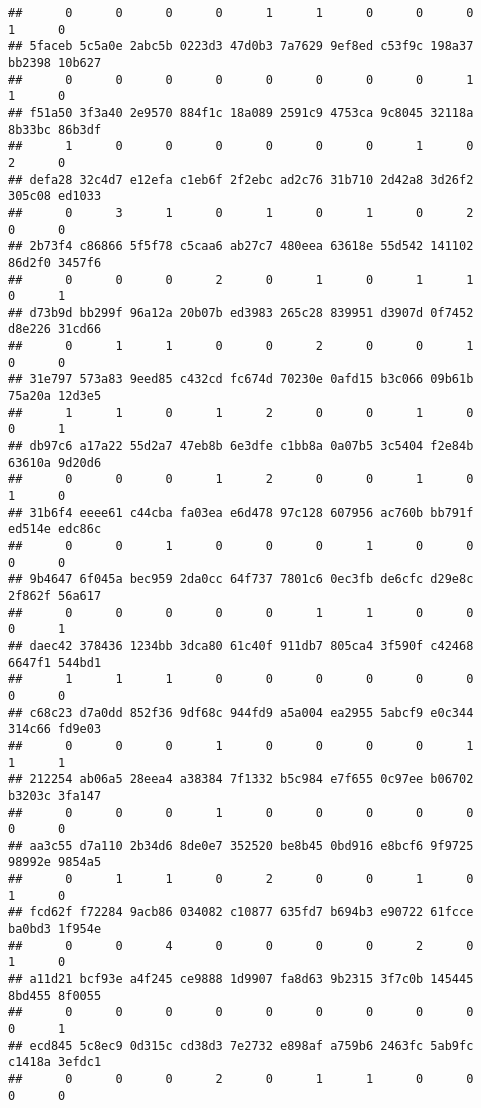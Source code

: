 \documentclass[
]{article}
\begin{document}
\begin{verbatim}
##      0      0      0      0      1      1      0      0      0      1      0 
## 5faceb 5c5a0e 2abc5b 0223d3 47d0b3 7a7629 9ef8ed c53f9c 198a37 bb2398 10b627 
##      0      0      0      0      0      0      0      0      1      1      0 
## f51a50 3f3a40 2e9570 884f1c 18a089 2591c9 4753ca 9c8045 32118a 8b33bc 86b3df 
##      1      0      0      0      0      0      0      1      0      2      0 
## defa28 32c4d7 e12efa c1eb6f 2f2ebc ad2c76 31b710 2d42a8 3d26f2 305c08 ed1033 
##      0      3      1      0      1      0      1      0      2      0      0 
## 2b73f4 c86866 5f5f78 c5caa6 ab27c7 480eea 63618e 55d542 141102 86d2f0 3457f6 
##      0      0      0      2      0      1      0      1      1      0      1 
## d73b9d bb299f 96a12a 20b07b ed3983 265c28 839951 d3907d 0f7452 d8e226 31cd66 
##      0      1      1      0      0      2      0      0      1      0      0 
## 31e797 573a83 9eed85 c432cd fc674d 70230e 0afd15 b3c066 09b61b 75a20a 12d3e5 
##      1      1      0      1      2      0      0      1      0      0      1 
## db97c6 a17a22 55d2a7 47eb8b 6e3dfe c1bb8a 0a07b5 3c5404 f2e84b 63610a 9d20d6 
##      0      0      0      1      2      0      0      1      0      1      0 
## 31b6f4 eeee61 c44cba fa03ea e6d478 97c128 607956 ac760b bb791f ed514e edc86c 
##      0      0      1      0      0      0      1      0      0      0      0 
## 9b4647 6f045a bec959 2da0cc 64f737 7801c6 0ec3fb de6cfc d29e8c 2f862f 56a617 
##      0      0      0      0      0      1      1      0      0      0      1 
## daec42 378436 1234bb 3dca80 61c40f 911db7 805ca4 3f590f c42468 6647f1 544bd1 
##      1      1      1      0      0      0      0      0      0      0      0 
## c68c23 d7a0dd 852f36 9df68c 944fd9 a5a004 ea2955 5abcf9 e0c344 314c66 fd9e03 
##      0      0      0      1      0      0      0      0      1      1      1 
## 212254 ab06a5 28eea4 a38384 7f1332 b5c984 e7f655 0c97ee b06702 b3203c 3fa147 
##      0      0      0      1      0      0      0      0      0      0      0 
## aa3c55 d7a110 2b34d6 8de0e7 352520 be8b45 0bd916 e8bcf6 9f9725 98992e 9854a5 
##      0      1      1      0      2      0      0      1      0      1      0 
## fcd62f f72284 9acb86 034082 c10877 635fd7 b694b3 e90722 61fcce ba0bd3 1f954e 
##      0      0      4      0      0      0      0      2      0      1      0 
## a11d21 bcf93e a4f245 ce9888 1d9907 fa8d63 9b2315 3f7c0b 145445 8bd455 8f0055 
##      0      0      0      0      0      0      0      0      0      0      1 
## ecd845 5c8ec9 0d315c cd38d3 7e2732 e898af a759b6 2463fc 5ab9fc c1418a 3efdc1 
##      0      0      0      2      0      1      1      0      0      0      0 

\end{verbatim}
\end{document}
